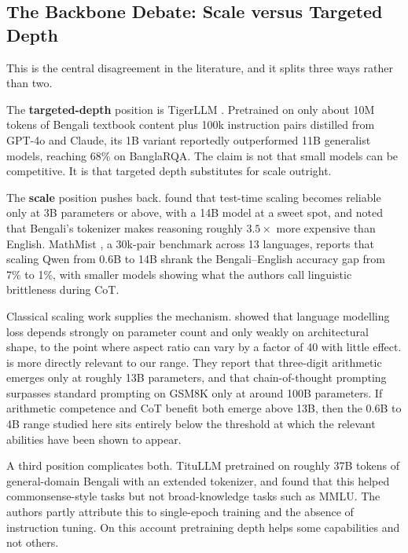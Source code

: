 \documentclass[10pt,twocolumn,letterpaper]{article}
\begin{document}
\subsection{The Backbone Debate: Scale versus Targeted Depth}

This is the central disagreement in the literature, and it splits three ways
rather than two.

The \textbf{targeted-depth} position is TigerLLM \parencite{raihan2025tigerllm}.
Pretrained on only about 10M tokens of Bengali textbook content plus 100k
instruction pairs distilled from GPT-4o and Claude, its 1B variant reportedly
outperformed 11B generalist models, reaching 68\% on BanglaRQA. The claim is not
that small models can be competitive. It is that targeted depth substitutes for
scale outright.

The \textbf{scale} position pushes back. \textcite{yong2025crosslingual} found
that test-time scaling becomes reliable only at 3B parameters or above, with a
14B model at a sweet spot, and noted that Bengali's tokenizer makes reasoning
roughly $3.5\times$ more expensive than English. MathMist
\parencite{sobhani2026mathmist}, a 30k-pair benchmark across 13 languages,
reports that scaling Qwen from 0.6B to 14B shrank the Bengali--English accuracy
gap from 7\% to 1\%, with smaller models showing what the authors call
linguistic brittleness during CoT.

Classical scaling work supplies the mechanism. \textcite{kaplan2020scaling} %
showed that language modelling loss depends strongly on parameter count and only
weakly on architectural shape, to the point where aspect ratio can vary by a
factor of 40 with little effect. \textcite{wei2022emergent} %
is more directly relevant to our range. They report that three-digit arithmetic
emerges only at roughly 13B parameters, and that chain-of-thought prompting
surpasses standard prompting on GSM8K only at around 100B parameters. If
arithmetic competence and CoT benefit both emerge above 13B, then the 0.6B to 4B
range studied here sits entirely below the threshold at which the relevant
abilities have been shown to appear.

A third position complicates both. TituLLM \parencite{nahin2025titullm}
pretrained on roughly 37B tokens of general-domain Bengali with an extended
tokenizer, and found that this helped commonsense-style tasks but not
broad-knowledge tasks such as MMLU. The authors partly attribute this to
single-epoch training and the absence of instruction tuning. On this account
pretraining depth helps some capabilities and not others.
\end{document}
